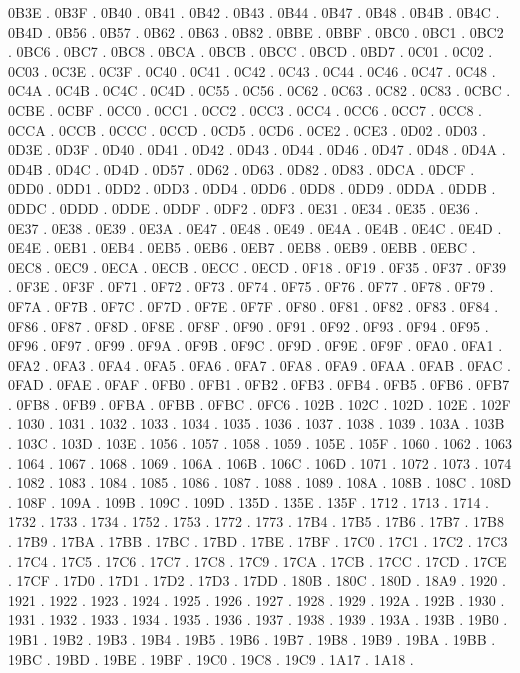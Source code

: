 0B3E .
0B3F .
0B40 .
0B41 .
0B42 .
0B43 .
0B44 .
0B47 .
0B48 .
0B4B .
0B4C .
0B4D .
0B56 .
0B57 .
0B62 .
0B63 .
0B82 .
0BBE .
0BBF .
0BC0 .
0BC1 .
0BC2 .
0BC6 .
0BC7 .
0BC8 .
0BCA .
0BCB .
0BCC .
0BCD .
0BD7 .
0C01 .
0C02 .
0C03 .
0C3E .
0C3F .
0C40 .
0C41 .
0C42 .
0C43 .
0C44 .
0C46 .
0C47 .
0C48 .
0C4A .
0C4B .
0C4C .
0C4D .
0C55 .
0C56 .
0C62 .
0C63 .
0C82 .
0C83 .
0CBC .
0CBE .
0CBF .
0CC0 .
0CC1 .
0CC2 .
0CC3 .
0CC4 .
0CC6 .
0CC7 .
0CC8 .
0CCA .
0CCB .
0CCC .
0CCD .
0CD5 .
0CD6 .
0CE2 .
0CE3 .
0D02 .
0D03 .
0D3E .
0D3F .
0D40 .
0D41 .
0D42 .
0D43 .
0D44 .
0D46 .
0D47 .
0D48 .
0D4A .
0D4B .
0D4C .
0D4D .
0D57 .
0D62 .
0D63 .
0D82 .
0D83 .
0DCA .
0DCF .
0DD0 .
0DD1 .
0DD2 .
0DD3 .
0DD4 .
0DD6 .
0DD8 .
0DD9 .
0DDA .
0DDB .
0DDC .
0DDD .
0DDE .
0DDF .
0DF2 .
0DF3 .
0E31 .
0E34 .
0E35 .
0E36 .
0E37 .
0E38 .
0E39 .
0E3A .
0E47 .
0E48 .
0E49 .
0E4A .
0E4B .
0E4C .
0E4D .
0E4E .
0EB1 .
0EB4 .
0EB5 .
0EB6 .
0EB7 .
0EB8 .
0EB9 .
0EBB .
0EBC .
0EC8 .
0EC9 .
0ECA .
0ECB .
0ECC .
0ECD .
0F18 .
0F19 .
0F35 .
0F37 .
0F39 .
0F3E .
0F3F .
0F71 .
0F72 .
0F73 .
0F74 .
0F75 .
0F76 .
0F77 .
0F78 .
0F79 .
0F7A .
0F7B .
0F7C .
0F7D .
0F7E .
0F7F .
0F80 .
0F81 .
0F82 .
0F83 .
0F84 .
0F86 .
0F87 .
0F8D .
0F8E .
0F8F .
0F90 .
0F91 .
0F92 .
0F93 .
0F94 .
0F95 .
0F96 .
0F97 .
0F99 .
0F9A .
0F9B .
0F9C .
0F9D .
0F9E .
0F9F .
0FA0 .
0FA1 .
0FA2 .
0FA3 .
0FA4 .
0FA5 .
0FA6 .
0FA7 .
0FA8 .
0FA9 .
0FAA .
0FAB .
0FAC .
0FAD .
0FAE .
0FAF .
0FB0 .
0FB1 .
0FB2 .
0FB3 .
0FB4 .
0FB5 .
0FB6 .
0FB7 .
0FB8 .
0FB9 .
0FBA .
0FBB .
0FBC .
0FC6 .
102B .
102C .
102D .
102E .
102F .
1030 .
1031 .
1032 .
1033 .
1034 .
1035 .
1036 .
1037 .
1038 .
1039 .
103A .
103B .
103C .
103D .
103E .
1056 .
1057 .
1058 .
1059 .
105E .
105F .
1060 .
1062 .
1063 .
1064 .
1067 .
1068 .
1069 .
106A .
106B .
106C .
106D .
1071 .
1072 .
1073 .
1074 .
1082 .
1083 .
1084 .
1085 .
1086 .
1087 .
1088 .
1089 .
108A .
108B .
108C .
108D .
108F .
109A .
109B .
109C .
109D .
135D .
135E .
135F .
1712 .
1713 .
1714 .
1732 .
1733 .
1734 .
1752 .
1753 .
1772 .
1773 .
17B4 .
17B5 .
17B6 .
17B7 .
17B8 .
17B9 .
17BA .
17BB .
17BC .
17BD .
17BE .
17BF .
17C0 .
17C1 .
17C2 .
17C3 .
17C4 .
17C5 .
17C6 .
17C7 .
17C8 .
17C9 .
17CA .
17CB .
17CC .
17CD .
17CE .
17CF .
17D0 .
17D1 .
17D2 .
17D3 .
17DD .
180B .
180C .
180D .
18A9 .
1920 .
1921 .
1922 .
1923 .
1924 .
1925 .
1926 .
1927 .
1928 .
1929 .
192A .
192B .
1930 .
1931 .
1932 .
1933 .
1934 .
1935 .
1936 .
1937 .
1938 .
1939 .
193A .
193B .
19B0 .
19B1 .
19B2 .
19B3 .
19B4 .
19B5 .
19B6 .
19B7 .
19B8 .
19B9 .
19BA .
19BB .
19BC .
19BD .
19BE .
19BF .
19C0 .
19C8 .
19C9 .
1A17 .
1A18 .
